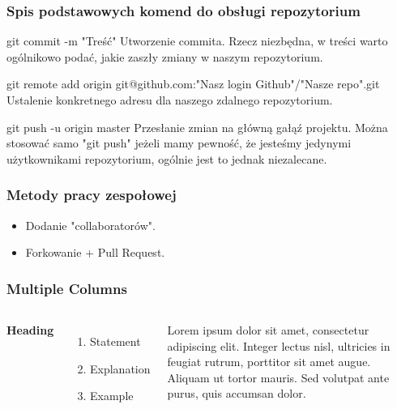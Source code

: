 \documentclass[9pt]{beamer}
\begin{document}
	
		
	\begin{frame}
		\frametitle{Spis podstawowych komend do obsługi repozytorium}

			\begin{block}{git commit -m "Treść"}
				Utworzenie commita. Rzecz niezbędna, w treści warto ogólnikowo podać, jakie zaszły zmiany w naszym repozytorium.
			\end{block}

			\begin{block}{git remote add origin git@github.com:"Nasz login Github"/"Nasze repo".git}
				Ustalenie konkretnego adresu dla naszego zdalnego repozytorium.
			\end{block}	

			\begin{block}{git push -u origin master}
				Przesłanie zmian na główną gałąź projektu. Można stosować samo "git push" jeżeli mamy pewność, że jesteśmy jedynymi użytkownikami repozytorium, ogólnie jest to jednak niezalecane.
			\end{block}	
			
					
						
	\end{frame}



	\begin{frame}
		\frametitle{Metody pracy zespołowej}
		\begin{itemize}
			\item Dodanie "collaboratorów".
			\item Forkowanie + Pull Request.
		\end{itemize}
	\end{frame}



	\begin{frame}
	\frametitle{Multiple Columns}
	\begin{columns}[c] %

	\textbf{Heading}
	\begin{enumerate}
	\item Statement
	\item Explanation
	\item Example
	\end{enumerate}

	Lorem ipsum dolor sit amet, consectetur adipiscing elit. Integer lectus nisl, ultricies in feugiat rutrum, porttitor sit amet augue. Aliquam ut tortor mauris. Sed volutpat ante purus, quis accumsan dolor.

	\end{columns}
	\end{frame}
\end{document}
